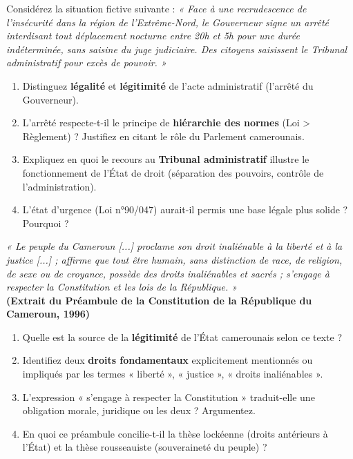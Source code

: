 \documentclass[11pt]{article}
\begin{document}
\begin{exercice}
Considérez la situation fictive suivante : \textit{« Face à une recrudescence de l'insécurité dans la région de l'Extrême-Nord, le Gouverneur signe un arrêté interdisant tout déplacement nocturne entre 20h et 5h pour une durée indéterminée, sans saisine du juge judiciaire. Des citoyens saisissent le Tribunal administratif pour excès de pouvoir. »}

\begin{enumerate}
    \item Distinguez \textbf{légalité} et \textbf{légitimité} de l'acte administratif (l'arrêté du Gouverneur).
    \item L'arrêté respecte-t-il le principe de \textbf{hiérarchie des normes} (Loi > Règlement) ? Justifiez en citant le rôle du Parlement camerounais.
    \item Expliquez en quoi le recours au \textbf{Tribunal administratif} illustre le fonctionnement de l'État de droit (séparation des pouvoirs, contrôle de l'administration).
    \item L'état d'urgence (Loi n°90/047) aurait-il permis une base légale plus solide ? Pourquoi ?
\end{enumerate}
\end{exercice}

\begin{exercice}
\textit{« Le peuple du Cameroun [...] proclame son droit inaliénable à la liberté et à la justice [...] ; affirme que tout être humain, sans distinction de race, de religion, de sexe ou de croyance, possède des droits inaliénables et sacrés ; s'engage à respecter la Constitution et les lois de la République. »} \\
\textbf{(Extrait du Préambule de la Constitution de la République du Cameroun, 1996)}

\begin{enumerate}
    \item Quelle est la source de la \textbf{légitimité} de l'État camerounais selon ce texte ?
    \item Identifiez deux \textbf{droits fondamentaux} explicitement mentionnés ou impliqués par les termes « liberté », « justice », « droits inaliénables ».
    \item L'expression « s'engage à respecter la Constitution » traduit-elle une obligation morale, juridique ou les deux ? Argumentez.
    \item En quoi ce préambule concilie-t-il la thèse lockéenne (droits antérieurs à l'État) et la thèse rousseauiste (souveraineté du peuple) ?
\end{enumerate}
\end{exercice}
\end{document}
